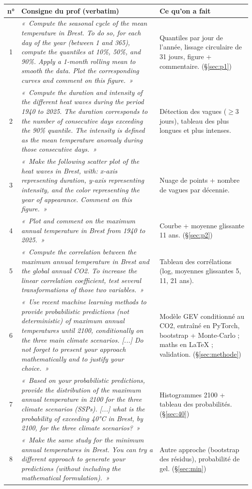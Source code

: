 \documentclass[11pt,a4paper]{article}
\newcommand{\en}[1]{\textit{«~#1~»}}
\begin{document}
\renewcommand{\arraystretch}{1.25}
\begin{tabularx}{\linewidth}{@{}c>{\raggedright\arraybackslash}X>{\raggedright\arraybackslash}p{5.6cm}@{}}
\toprule
\textbf{n°} & \textbf{Consigne du prof (verbatim)} & \textbf{Ce qu'on a fait} \\
\midrule
1 & \small\en{Compute the seasonal cycle of the mean temperature in Brest. To do so, for each day of the year (between 1 and 365), compute the quantiles at 10\%, 50\%, and 90\%. Apply a 1-month rolling mean to smooth the data. Plot the corresponding curves and comment on this figure.} & \small Quantiles par jour de l'année, lissage circulaire de 31 jours, figure + commentaire. (§\ref{sec:p1}) \\
2 & \small\en{Compute the duration and intensity of the different heat waves during the period 1940 to 2025. The duration corresponds to the number of consecutive days exceeding the 90\% quantile. The intensity is defined as the mean temperature anomaly during those consecutive days.} & \small Détection des vagues ($\ge 3$ jours), tableau des plus longues et plus intenses. \\
3 & \small\en{Make the following scatter plot of the heat waves in Brest, with: x-axis representing duration, y-axis representing intensity, and the color representing the year of appearance. Comment on this figure.} & \small Nuage de points + nombre de vagues par décennie. \\
4 & \small\en{Plot and comment on the maximum annual temperature in Brest from 1940 to 2025.} & \small Courbe + moyenne glissante 11 ans. (§\ref{sec:p2}) \\
5 & \small\en{Compute the correlation between the maximum annual temperature in Brest and the global annual CO2. To increase the linear correlation coefficient, test several transformations of those two variables.} & \small Tableau des corrélations (log, moyennes glissantes 5, 11, 21 ans). \\
6 & \small\en{Use recent machine learning methods to provide probabilistic predictions (not deterministic) of maximum annual temperatures until 2100, conditionally on the three main climate scenarios. [...] Do not forget to present your approach mathematically and to justify your choice.} & \small Modèle GEV conditionné au CO2, entraîné en PyTorch, bootstrap + Monte-Carlo ; maths en LaTeX ; validation. (§\ref{sec:methode}) \\
7 & \small\en{Based on your probabilistic predictions, provide the distribution of the maximum annual temperature in 2100 for the three climate scenarios (SSPs). [...] what is the probability of exceeding 40°C in Brest, by 2100, for the three climate scenarios?} & \small Histogrammes 2100 + tableau des probabilités. (§\ref{sec:40}) \\
8 & \small\en{Make the same study for the minimum annual temperatures in Brest. You can try a different approach to generate your predictions (without including the mathematical formulation).} & \small Autre approche (bootstrap des résidus), probabilité de gel. (§\ref{sec:min}) \\
\bottomrule
\end{tabularx}
\end{document}
